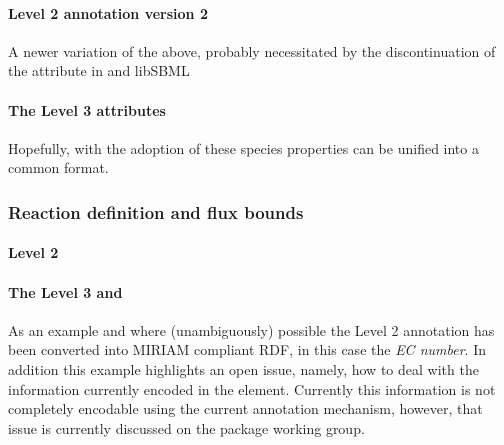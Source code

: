 \paragraph{\SBML Level 2 \Species annotation version 2}
A newer variation of the above, probably necessitated by the discontinuation of the  attribute in \SBML and \textsf{libSBML}
%

\paragraph{The \SBML Level 3 \Species attributes}
Hopefully, with the adoption of \SBML \FBC these species properties can be unified into a common format.
%

\subsubsection*{Reaction definition and flux bounds}

\paragraph{\SBML Level 2 \Reaction}
%

\paragraph{The \SBML Level 3 \Reaction and \FluxBound}

As an example and where (unambiguously) possible the \SBML Level 2 annotation has been converted into MIRIAM compliant RDF, in this case the \textit{EC number}. In addition this example highlights an open issue, namely, how to deal with the information currently encoded in the \Notes element. Currently this information is not completely encodable using the current \SBML annotation mechanism, however, that issue is currently discussed on the package working group.
%
%
